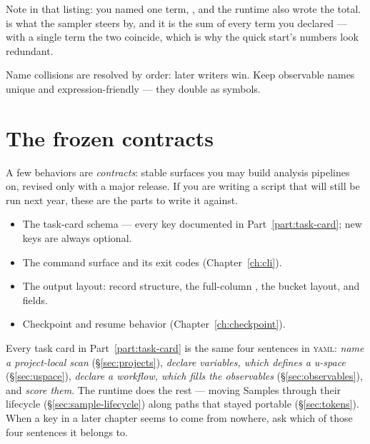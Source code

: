 Note  in that listing: you named one term, , and the runtime
also wrote the total.  is what the sampler steers by, and it is the sum of
every term you declared --- with a single term the two coincide, which is why the quick
start's numbers look redundant.

Name collisions are resolved by order: later writers win. Keep observable names unique
and expression-friendly --- they double as symbols.

\section{The frozen contracts}
\label{sec:contracts}

A few behaviors are \emph{contracts}: stable surfaces you may build analysis pipelines
on, revised only with a major release. If you are writing a script that will still be run
next year, these are the parts to write it against.

\begin{itemize}
  \item The task-card schema --- every key documented in Part~\ref{part:task-card}; new
        keys are always optional.
  \item The  command surface and its exit codes (Chapter~\ref{ch:cli}).
  \item The output layout:  record structure, the
        full-column , the  bucket layout, and
         fields.
  \item Checkpoint and resume behavior (Chapter~\ref{ch:checkpoint}).
\end{itemize}

\begin{jtip}
Every task card in Part~\ref{part:task-card} is the same four sentences in \textsc{yaml}:
\emph{name a project-local scan} (\S\ref{sec:projects}), \emph{declare variables, which
defines a u-space} (\S\ref{sec:uspace}), \emph{declare a workflow, which fills the
observables} (\S\ref{sec:observables}), and \emph{score them}. The runtime does the rest
--- moving Samples through their lifecycle (\S\ref{sec:sample-lifecycle}) along paths
that stayed portable (\S\ref{sec:tokens}). When a key in a later chapter seems to come
from nowhere, ask which of those four sentences it belongs to.
\end{jtip}
